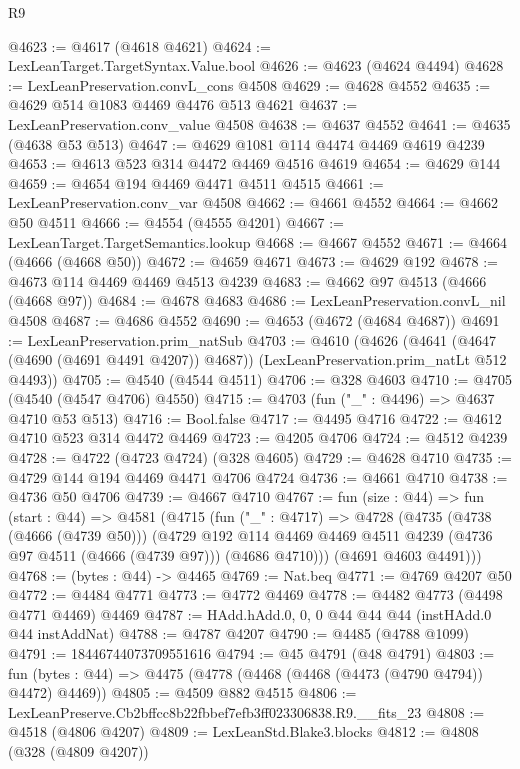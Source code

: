 \begin{lexlean}{R9}
\begin{coremodule}
@4623 := @4617 (@4618 @4621)
@4624 := LexLeanTarget.TargetSyntax.Value.bool
@4626 := @4623 (@4624 @4494)
@4628 := LexLeanPreservation.convL_cons @4508
@4629 := @4628 @4552
@4635 := @4629 @514 @1083 @4469 @4476 @513 @4621
@4637 := LexLeanPreservation.conv_value @4508
@4638 := @4637 @4552
@4641 := @4635 (@4638 @53 @513)
@4647 := @4629 @1081 @114 @4474 @4469 @4619 @4239
@4653 := @4613 @523 @314 @4472 @4469 @4516 @4619
@4654 := @4629 @144
@4659 := @4654 @194 @4469 @4471 @4511 @4515
@4661 := LexLeanPreservation.conv_var @4508
@4662 := @4661 @4552
@4664 := @4662 @50 @4511
@4666 := @4554 (@4555 @4201)
@4667 := LexLeanTarget.TargetSemantics.lookup
@4668 := @4667 @4552
@4671 := @4664 (@4666 (@4668 @50))
@4672 := @4659 @4671
@4673 := @4629 @192
@4678 := @4673 @114 @4469 @4469 @4513 @4239
@4683 := @4662 @97 @4513 (@4666 (@4668 @97))
@4684 := @4678 @4683
@4686 := LexLeanPreservation.convL_nil @4508
@4687 := @4686 @4552
@4690 := @4653 (@4672 (@4684 @4687))
@4691 := LexLeanPreservation.prim_natSub
@4703 := @4610
    (@4626
      (@4641 (@4647 (@4690 (@4691 @4491 @4207)) @4687))
      (LexLeanPreservation.prim_natLt @512 @4493))
@4705 := @4540 (@4544 @4511)
@4706 := @328 @4603
@4710 := @4705 (@4540 (@4547 @4706) @4550)
@4715 := @4703 (fun ("_" : @4496) => @4637 @4710 @53 @513)
@4716 := Bool.false
@4717 := @4495 @4716
@4722 := @4612 @4710 @523 @314 @4472 @4469
@4723 := @4205 @4706
@4724 := @4512 @4239
@4728 := @4722 (@4723 @4724) (@328 @4605)
@4729 := @4628 @4710
@4735 := @4729 @144 @194 @4469 @4471 @4706 @4724
@4736 := @4661 @4710
@4738 := @4736 @50 @4706
@4739 := @4667 @4710
@4767 := fun (size : @44) =>
  fun (start : @44) =>
  @4581
    (@4715
      (fun ("_" : @4717) =>
      @4728
        (@4735
          (@4738 (@4666 (@4739 @50)))
          (@4729
            @192
            @114
            @4469
            @4469
            @4511
            @4239
            (@4736 @97 @4511 (@4666 (@4739 @97)))
            (@4686 @4710)))
        (@4691 @4603 @4491)))
@4768 := (bytes : @44) -> @4465
@4769 := Nat.beq
@4771 := @4769 @4207 @50
@4772 := @4484 @4771
@4773 := @4772 @4469
@4778 := @4482 @4773 (@4498 @4771 @4469) @4469
@4787 := HAdd.hAdd.{0, 0, 0} @44 @44 @44 (instHAdd.{0} @44 instAddNat)
@4788 := @4787 @4207
@4790 := @4485 (@4788 @1099)
@4791 := 18446744073709551616
@4794 := @45 @4791 (@48 @4791)
@4803 := fun (bytes : @44) => @4475 (@4778 (@4468 (@4468 (@4473 (@4790 @4794)) @4472) @4469))
@4805 := @4509 @882 @4515
@4806 := LexLeanPreserve.Cb2bffcc8b22fbbef7efb3ff023306838.R9.__fits_23
@4808 := @4518 (@4806 @4207)
@4809 := LexLeanStd.Blake3.blocks
@4812 := @4808 (@328 (@4809 @4207))

\end{coremodule}
\end{lexlean}
